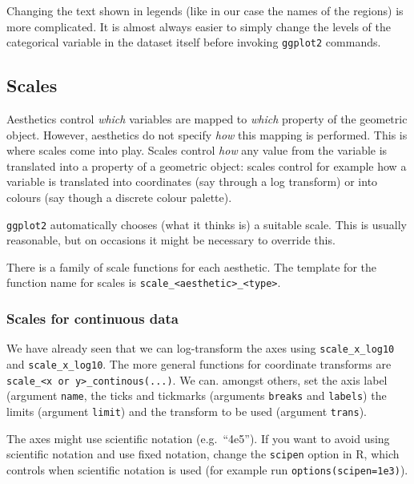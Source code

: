 \documentclass[
]{book}
\begin{document}
Changing the text shown in legends (like in our case the names of the regions) is more complicated. It is almost always easier to simply change the levels of the categorical variable in the dataset itself before invoking \texttt{ggplot2} commands.

\hypertarget{scales}{%
\subsection{Scales}\label{scales}}

Aesthetics control \emph{which} variables are mapped to \emph{which} property of the geometric object. However, aesthetics do not specify \emph{how} this mapping is performed. This is where scales come into play. Scales control \emph{how} any value from the variable is translated into a property of a geometric object: scales control for example how a variable is translated into coordinates (say through a log transform) or into colours (say though a discrete colour palette).

\texttt{ggplot2} automatically chooses (what it thinks is) a suitable scale. This is usually reasonable, but on occasions it might be necessary to override this.

There is a family of scale functions for each aesthetic. The template for the function name for scales is \texttt{scale\_\textless{}aesthetic\textgreater{}\_\textless{}type\textgreater{}}.

\hypertarget{scales-for-continuous-data}{%
\subsubsection{Scales for continuous data}\label{scales-for-continuous-data}}

We have already seen that we can log-transform the axes using \texttt{scale\_x\_log10} and \texttt{scale\_x\_log10}. The more general functions for coordinate transforms are \texttt{scale\_\textless{}x\ or\ y\textgreater{}\_continous(...)}. We can. amongst others, set the axis label (argument \texttt{name}, the ticks and tickmarks (arguments \texttt{breaks} and \texttt{labels}) the limits (argument \texttt{limit}) and the transform to be used (argument \texttt{trans}).

The axes might use scientific notation (e.g.~``4e5''). If you want to avoid using scientific notation and use fixed notation, change the \texttt{scipen} option in R, which controls when scientific notation is used (for example run \texttt{options(scipen=1e3)}).
\end{document}

